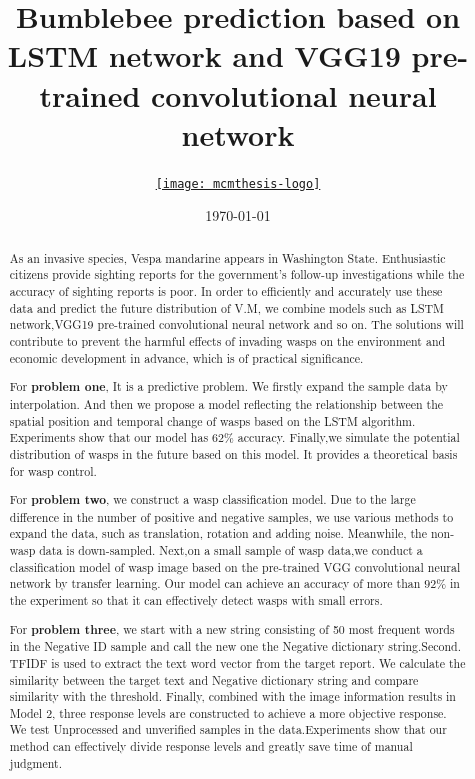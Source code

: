 \documentclass{mcmthesis}
\title{Bumblebee prediction based on LSTM network and VGG19 pre-trained convolutional neural network}%
\author{\small \href{https://www.latexstudio.net/}
  {\texttt{[image: mcmthesis-logo]}}}
\date{\today}
\begin{document}
\begin{abstract}%
	
As an invasive species, Vespa mandarine appears in Washington State. Enthusiastic citizens provide sighting reports for the government's follow-up investigations while the accuracy of sighting reports is poor. In order to efficiently and accurately use these data and predict the future distribution of V.M, we combine models such as LSTM network,VGG19 pre-trained convolutional neural network and so on. The solutions will contribute to prevent the harmful effects of invading wasps on the environment and economic development in advance, which is of practical significance.

For \textbf{problem one}, It is a predictive problem. We firstly expand the sample data by interpolation. And then we propose a model reflecting the relationship between the spatial position and temporal change of wasps based on the LSTM algorithm. Experiments show that our model has $ 62\% $ accuracy. Finally,we simulate the potential distribution of wasps in the future based on this model. It provides a theoretical basis for wasp control.

For \textbf{problem two}, we construct a wasp classification model. Due to the large difference in the number of positive and negative samples, we use various methods to expand the data, such as translation, rotation and adding noise. Meanwhile, the non-wasp data is down-sampled. Next,on a small sample of wasp data,we conduct a  classification model of wasp image based on the pre-trained VGG convolutional neural network by transfer learning.  Our model can achieve an accuracy of more than $ 92\% $ in the experiment so that it can effectively detect wasps with small errors.

For \textbf{problem three}, we start with a new string consisting of 50 most frequent words in the Negative ID sample and call the new one the Negative dictionary string.Second. TFIDF is used to extract the text word vector from the target report. We calculate the similarity between the target text and Negative dictionary string and compare similarity with the threshold. Finally, combined with the image information results in Model 2, three response levels are constructed to achieve a more objective response. We test Unprocessed and unverified samples in the data.Experiments show that our method can effectively divide response levels and greatly save time of manual judgment.


\end{abstract}
\end{document}
